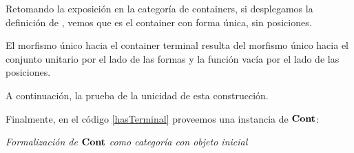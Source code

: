 Retomando la exposición en la categoría de containers, si desplegamos la definición de , vemos que  es el container con forma única, sin posiciones.



El morfismo único hacia el container terminal resulta del morfismo único hacia el conjunto unitario por el lado de las formas y la función vacía por el lado de las posiciones.


A continuación, la prueba de la unicidad de esta construcción. 



Finalmente, en el código \ref{hasTerminal} proveemos una instancia de  $\mathbf{Cont}$:

\begin{agdacode}{\it Formalización de $\mathbf{Cont}$ como categoría con objeto inicial} \label{hasTerminal}

\end{agdacode}
